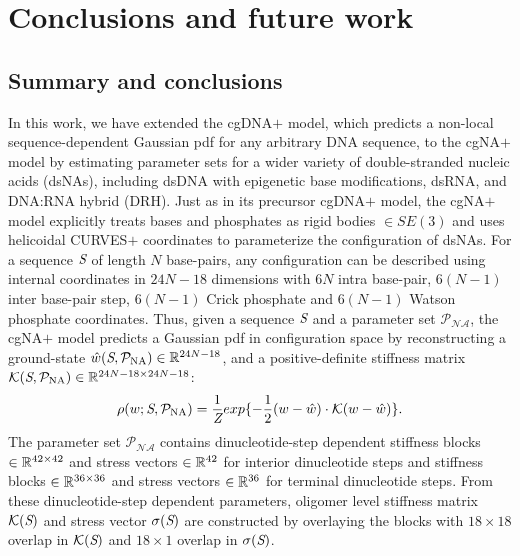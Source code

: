\chapter{Conclusions and future work}\label{c8}

\section{Summary and conclusions}

In this work, we have extended the cgDNA$+$ model, which predicts a non-local sequence-dependent Gaussian pdf for any arbitrary DNA sequence, to the cgNA$+$ model by estimating parameter sets for a wider variety of double-stranded nucleic acids (dsNAs), including dsDNA with epigenetic base modifications, dsRNA, and DNA:RNA hybrid (DRH).
Just as in its precursor cgDNA$+$ model, the cgNA$+$ model explicitly treats bases and phosphates as rigid bodies $\in SE(3)$ and uses helicoidal CURVES$+$ coordinates to parameterize the configuration of dsNAs.
For a sequence ${\textit{S}}$ of length $N$ base-pairs, any configuration can be described using internal coordinates in $24N-18$ dimensions with $6N$ intra base-pair, $6(N-1)$ inter base-pair step, $6(N-1)$ Crick phosphate and $6(N-1)$ Watson phosphate coordinates.
Thus, given a sequence ${\textit{S}}$ and a parameter set $\mathcal{P_{\text{NA}}}$,
the cgNA$+$ model predicts a Gaussian pdf in configuration space by reconstructing a ground-state $\hat{w} ({\textit{S}}, \mathcal{P_{\text{NA}}}) \in {\mathbb R}^{24N-18}$,
and a positive-definite stiffness matrix
${\mathcal K} ({\textit{S}}, \mathcal{P_{\text{NA}}}) \in {\mathbb R}^{24N-18 \times 24N-18}$:
\begin{equation}
\rho(w; {\textit{S}}, \mathcal{P_{\text{NA}}}) = \frac{1}{\textit{Z}} exp \{-\frac{1}{2}(w-\hat{w})\cdot {\mathcal K} (w-\hat{w})\}.
\end{equation}
The parameter set $\mathcal{P_{\text{NA}}}$ contains dinucleotide-step dependent stiffness blocks $\in {\mathbb R}^{42 \times 42}$ and stress vectors $\in {\mathbb R}^{42}$ for interior dinucleotide steps and stiffness blocks $\in {\mathbb R}^{36 \times 36}$ and stress vectors $\in {\mathbb R}^{36}$ for terminal dinucleotide steps.
From these dinucleotide-step dependent parameters, oligomer level stiffness matrix ${\mathcal K}({\textit{S}})$ and stress vector $\sigma({\textit{S}})$ are constructed by overlaying the blocks with $18 \times 18$ overlap in ${\mathcal K}({\textit{S}})$ and $18 \times 1$ overlap in $\sigma({\textit{S}})$.
